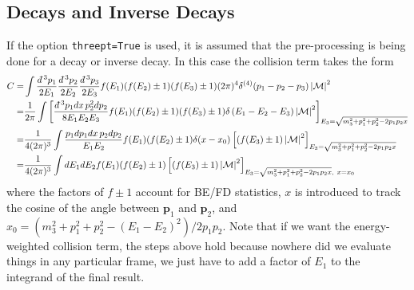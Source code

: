 \documentclass[superscriptaddress,nofootinbib,notitlepage,onecolumn]{revtex4-1}
\newcommand{\abs}[1]{\left| #1 \right|}
\renewcommand{\vec}[1]{\mathbf{#1}}
\newcommand{\code}[1]{\texttt{#1}}
\newcommand{\dbar}{d\hspace*{-0.08em}\bar{}\hspace*{0.1em}\hspace{0.05cm}}
\begin{document}
\subsection{Decays and Inverse Decays}
If the option \code{threept=True} is used, it is assumed that the pre-processing is being done for a decay or inverse decay. In this case the collision term takes the form 
\begin{align}
C = &\int \frac{\dbar^3 p_1}{2 E_1}\frac{\dbar^3 p_2}{2 E_2}\frac{\dbar^3 p_3}{2 E_3} f(E_1) (f(E_2)\pm1) (f(E_3)\pm1) (2 \pi)^4 \delta^{(4)}(p_1-p_2-p_3) \abs{\mathcal{M}}^2 \\
=&\frac{1}{2 \pi} \int \left[ \frac{\dbar^3 p_1 d x\, p_2^2 d p_2 }{8 E_1 E_2 E_3}f(E_1) (f(E_2)\pm1) (f(E_3)\pm1) \delta\left(E_1 - E_2 - E_3\right) \abs{\mathcal{M}}^2\right]_{E_3 = \sqrt{m_3^2 + p_1^2 + p_2^2 - 2 p_1 p_2 x}} \\
=&\frac{1}{4(2 \pi)^3} \int  \frac{p_1 d p_1 d x\, p_2 d p_2 }{ E_1 E_2}f(E_1) (f(E_2)\pm1) \delta(x-x_0)\left[ (f(E_3)\pm1)  \abs{\mathcal{M}}^2\right]_{E_3 = \sqrt{m_3^2 + p_1^2 + p_2^2 - 2 p_1 p_2 x}}\\
=&\frac{1}{4(2 \pi)^3} \int  d E_1 d E_2 f(E_1) (f(E_2)\pm1)\left[ (f(E_3)\pm1) \abs{\mathcal{M}}^2\right]_{E_3 = \sqrt{m_3^2 + p_1^2 + p_2^2 - 2 p_1 p_2 x}, ~x = x_0}
\end{align}
where the factors of $f\pm 1$ account for BE/FD statistics, $x$ is introduced to track the cosine of the angle between $\vec{p}_1$ and $\vec{p}_2$, and $x_0  = (m_3^2 +p_1^2 + p_2^2  - (E_1-E_2)^2)/2 p_1 p_2$. Note that if we want the energy-weighted collision term, the steps above hold because nowhere did we evaluate things in any particular frame, we just have to add a factor of $E_1$ to the integrand of the final result.
\end{document}
